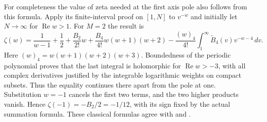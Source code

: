 For completeness the value of zeta needed at the first axis pole
also follows from this formula. Apply its finite-interval proof
on $[1,N]$ to $v^{-w}$ and initially let $N\to\infty$
for $\operatorname{Re}w>1$. For $M=2$ the result is
\[
 \zeta(w)=\frac1{w-1}+\frac12
    +\frac{B_2}{2!}w+\frac{B_4}{4!}w(w+1)(w+2)
    -\frac{(w)_4}{4!}\int_1^\infty
                     \widetilde B_4(v)v^{-w-4}\,dv.
\]
Here $(w)_4=w(w+1)(w+2)(w+3)$.
Boundedness of the periodic polynomial proves that the last
integral is holomorphic for $\operatorname{Re}w>-3$, with
all complex derivatives justified by the integrable logarithmic
weights on compact subsets. Thus the equality continues there
apart from the pole at one. Substitution $w=-1$ cancels the
first two terms, and the two higher products vanish. Hence
$\zeta(-1)=-B_2/2=-1/12$, with its sign fixed by the actual
summation formula. These classical formulas agree with
\cite[\S2.10(i)]{cqDLMFEM} and \cite[\S25.6(i)]{cqDLMFZeta}.
